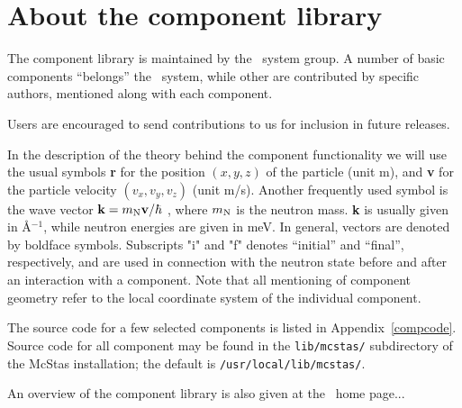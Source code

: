 
\chapter{About the component library}
\label{s:components}
The component library is
maintained by the \MCS\ system group. A number of basic components 
``belongs'' the \MCS\ system, while other are contributed
by specific authors, mentioned  along with each component.

Users are encouraged to send
contributions to us for inclusion in future releases.

In the description of the theory behind the component functionality 
we will use the usual symbols {\bf r} for the position 
$(x,y,z)$ of the particle (unit m), and {\bf v} for 
the particle velocity $(v_x, v_y, v_z)$ (unit m/s).
Another frequently used symbol is 
the wave vector ${\bf k} = m_{\rm N} {\bf v}/\hbar$ , where
$m_{\rm N}$ is the neutron mass. {\bf k} is usually given in
\AA$^{-1}$, while neutron energies are given in meV.
In general, vectors are denoted by boldface symbols.
Subscripts "i" and "f" denotes ``initial'' and ``final'', respectively,
and are used in connection with the neutron state before and after
an interaction with a component.
Note that all mentioning of component geometry refer to
the local coordinate system of the individual component.

The source code for a few selected components is listed 
in Appendix~\ref{compcode}. 
Source code for all component may be found in the \verb+lib/mcstas/+
subdirectory of the McStas installation; 
the default is \verb+/usr/local/lib/mcstas/+.

An overview of the component library is also given at the \MCS\ home page...









